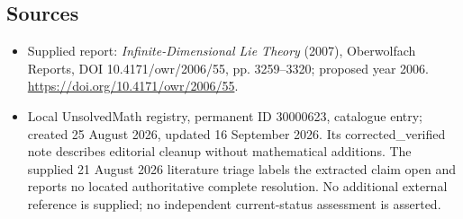 \documentclass[11pt]{article}
\begin{document}
\subsection{Sources}
\begin{itemize}
\item Supplied report: \emph{Infinite-Dimensional Lie Theory} (2007), Oberwolfach Reports, DOI 10.4171/owr/2006/55, pp. 3259--3320; proposed year 2006. \url{https://doi.org/10.4171/owr/2006/55}.
\item Local UnsolvedMath registry, permanent ID 30000623, catalogue entry; created 25 August 2026, updated 16 September 2026. Its corrected\_verified note describes editorial cleanup without mathematical additions. The supplied 21 August 2026 literature triage labels the extracted claim open and reports no located authoritative complete resolution. No additional external reference is supplied; no independent current-status assessment is asserted.
\end{itemize}
\end{document}
